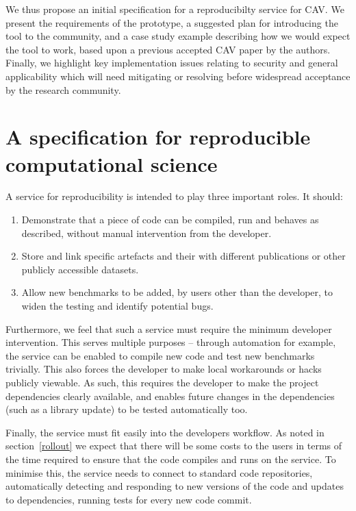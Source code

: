 \documentclass{llncs}
\begin{document}
We thus propose an initial specification for a reproducibilty
service for CAV. We present the requirements of the prototype, a suggested
plan for introducing the tool to the community, and a case study
example describing how we would expect the tool to work, based upon a
previous accepted CAV paper by the authors. Finally, we highlight key
implementation issues relating to security and general applicability
which will need mitigating or resolving before widespread acceptance
by the research community.

\section{A specification for reproducible computational science}\label{spec}

A service for reproducibility is intended to play three important roles. It should:
\begin{enumerate}
	\item Demonstrate that a piece of code can be compiled, run and behaves as described,
		without manual intervention from the developer.
	\item Store and link specific artefacts and their with different publications
		or other publicly accessible datasets.
	\item Allow new benchmarks to be added, by users other than the developer, to 
		widen the testing and identify potential bugs.
\end{enumerate}
 
Furthermore, we feel that such a service must require the minimum developer intervention.
This serves multiple purposes -- through automation for example, the service can be enabled to compile 
new code and test new benchmarks trivially. This also forces the developer to make local
workarounds or hacks publicly viewable. As such, this requires the developer to make the 
project dependencies clearly available, and enables future changes in the dependencies 
(such as a library update) to be tested automatically too. 

Finally, the service must fit easily into the developers workflow. As
noted in section~\ref{rollout} we expect that there will be some costs
to the users in terms of the time required to ensure that the code
compiles and runs on the service. To minimise this, the service needs
to connect to standard code repositories, automatically detecting and
responding to new versions of the code and updates to dependencies,
running tests for every new code commit.
\end{document}
